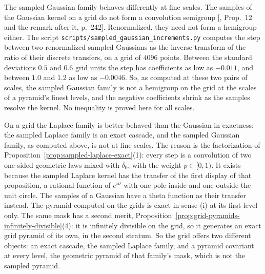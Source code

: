 The sampled Gaussian family behaves differently at fine scales. The samples of the Gaussian kernel
on a grid do not form a convolution semigroup [, Prop.~12 and the
remark after it, p.~242]. Renormalized, they need not form a hemigroup either. The script
\texttt{scripts/sampled\_gaussian\_increments.py} computes the step between two renormalized
sampled Gaussians as the inverse transform of the ratio of their discrete transfers, on a grid of
$4096$ points. Between the standard deviations $0.5$ and $0.6$ grid units the step has
coefficients as low as $-0.011$, and between $1.0$ and $1.2$ as low as $-0.0046$. So, as computed
at these two pairs of scales, the sampled Gaussian family is not a hemigroup on the grid at the
scales of a pyramid's finest levels, and the negative coefficients shrink as the samples resolve
the kernel. No inequality is proved here for all scales.

On a grid the Laplace family is better behaved than the Gaussian in exactness: the sampled Laplace
family is an exact cascade, and the sampled Gaussian family, as computed above, is not at fine
scales. The reason is the factorization of
Proposition~\ref{prop:sampled-laplace-exact}(1): every step is a convolution of two
one-sided geometric laws mixed with $\delta_0$, with the weight $p \in [0,1)$. It exists because
the sampled Laplace kernel has the transfer of the first display of that proposition, a rational
function of $e^{i\vartheta}$ with one pole inside and one outside the unit circle. The samples of
a Gaussian have a theta function as their transfer instead. The \Matern{} pyramid computed on the
grids is exact in sense (i) at its first level only. The same mask has a second merit,
Proposition~\ref{prop:grid-pyramids-infinitely-divisible}(4): it is infinitely divisible on the
grid, so it generates an exact grid pyramid of its own, in the second stratum. So the grid
offers two different objects: an exact cascade, the sampled Laplace family, and a pyramid
covariant at every level, the geometric pyramid of that family's mask, which is not the sampled
\Matern{} pyramid.

